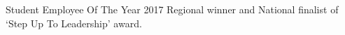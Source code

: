 \sectionsep{}
\begin{tightemize}
  \item Student Employee Of The Year 2017 Regional winner and National finalist of `Step Up To Leadership' award.
\end{tightemize}
\sectionsep{}
